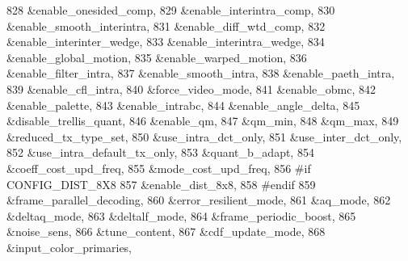 \begin{DoxyCodeInclude}
{{{{{{{828                                        &enable\_onesided\_comp,
829                                        &enable\_interintra\_comp,
830                                        &enable\_smooth\_interintra,
831                                        &enable\_diff\_wtd\_comp,
832                                        &enable\_interinter\_wedge,
833                                        &enable\_interintra\_wedge,
834                                        &enable\_global\_motion,
835                                        &enable\_warped\_motion,
836                                        &enable\_filter\_intra,
837                                        &enable\_smooth\_intra,
838                                        &enable\_paeth\_intra,
839                                        &enable\_cfl\_intra,
840                                        &force\_video\_mode,
841                                        &enable\_obmc,
842                                        &enable\_palette,
843                                        &enable\_intrabc,
844                                        &enable\_angle\_delta,
845                                        &disable\_trellis\_quant,
846                                        &enable\_qm,
847                                        &qm\_min,
848                                        &qm\_max,
849                                        &reduced\_tx\_type\_set,
850                                        &use\_intra\_dct\_only,
851                                        &use\_inter\_dct\_only,
852                                        &use\_intra\_default\_tx\_only,
853                                        &quant\_b\_adapt,
854                                        &coeff\_cost\_upd\_freq,
855                                        &mode\_cost\_upd\_freq,
856 \textcolor{preprocessor}{#if CONFIG\_DIST\_8X8}
857                                        &enable\_dist\_8x8,
858 \textcolor{preprocessor}{#endif}
859                                        &frame\_parallel\_decoding,
860                                        &error\_resilient\_mode,
861                                        &aq\_mode,
862                                        &deltaq\_mode,
863                                        &deltalf\_mode,
864                                        &frame\_periodic\_boost,
865                                        &noise\_sens,
866                                        &tune\_content,
867                                        &cdf\_update\_mode,
868                                        &input\_color\_primaries,
}}}}}}}
\end{DoxyCodeInclude}
